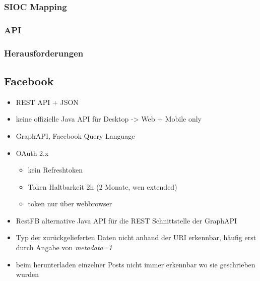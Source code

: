 \subsubsection{SIOC Mapping} %
\label{ssub:moodle_sioc_mapping}

\subsubsection{API} %
\label{ssub:moolde_api}

\subsubsection{Herausforderungen} %
\label{ssub:moodle_herausforderungen}





\subsection{Facebook} %
\label{sub:facebook_connector}

\begin{itemize}
    \item REST API + JSON
    \item keine offizielle Java API für Desktop -> Web + Mobile only
    \item GraphAPI, Facebook Query Language
    \item OAuth 2.x
    \begin{itemize}
        \item kein Refreshtoken
        \item Token Haltbarkeit 2h (2 Monate, wen extended)
        \item token nur über webbrowser
    \end{itemize}
    \item RestFB alternative Java API für die REST Schnittstelle der GraphAPI
    \item Typ der zurückgelieferten Daten nicht anhand der URI erkennbar, häufig erst durch Angabe von \emph{metadata=1}
    \item beim herunterladen einzelner Posts nicht immer erkennbar wo sie geschrieben wurden
\end{itemize}

